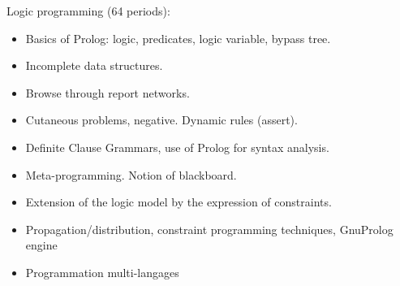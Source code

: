 Logic programming (64 periods):
\begin{itemize}
    \item Basics of Prolog: logic, predicates, logic variable, bypass tree.
    \item Incomplete data structures.
    \item Browse through report networks.
    \item Cutaneous problems, negative. Dynamic rules (assert).
    \item Definite Clause Grammars, use of Prolog for syntax analysis.
    \item Meta-programming. Notion of blackboard.
    \item Extension of the logic model by the expression of constraints.
    \item Propagation/distribution, constraint programming techniques, GnuProlog engine
    \item Programmation multi-langages
\end{itemize}